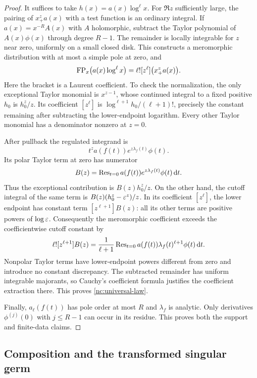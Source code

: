 \begin{proof}
It suffices to take $h(x)=a(x)\log^\ell x$. For $\Re z$ sufficiently
large, the pairing of $x_+^za(x)$ with a test function is an ordinary
integral. If $a(x)=x^{-R}A(x)$ with $A$ holomorphic, subtract the Taylor
polynomial of $A(x)\phi(x)$ through degree $R-1$. The remainder is
locally integrable for $z$ near zero, uniformly on a small closed disk.
This constructs a meromorphic distribution with at most a simple pole
at zero, and
\begin{equation}\label{nc:regulator-fp}
 \operatorname{FP}_x\bigl(a(x)\log^\ell x\bigr)
       =\ell![z^\ell]\bigl(x_+^za(x)\bigr).
\end{equation}
Here the bracket is a Laurent coefficient. To check the normalization,
the only exceptional Taylor monomial is $x^{z-1}$, whose continued
integral to a fixed positive $h_0$ is $h_0^z/z$. Its coefficient
$[z^\ell]$ is $\log^{\ell+1}h_0/(\ell+1)!$, precisely the constant
remaining after subtracting the lower-endpoint logarithm. Every other
Taylor monomial has a denominator nonzero at $z=0$.

After pullback the regulated integrand is
\[
 t^z a(f(t))e^{z\lambda_f(t)}\phi(t).
\]
Its polar Taylor term at zero has numerator
\begin{equation}\label{nc:Bregulator}
 B(z)=\operatorname{Res}_{t=0}a(f(t))e^{z\lambda_f(t)}\phi(t)\,\mathrm d t.
\end{equation}
Thus the exceptional contribution is $B(z)h_0^z/z$. On the other
hand, the cutoff integral of the same term is
$B(z)(h_0^z-\varepsilon^z)/z$. In its coefficient $[z^\ell]$, the lower
endpoint has constant term $[z^{\ell+1}]B(z)$: all its other terms
are positive powers of $\log\varepsilon$. Consequently the meromorphic
coefficient exceeds the coefficientwise cutoff constant by
\[
 \ell![z^{\ell+1}]B(z)
   =\frac1{\ell+1}\operatorname{Res}_{t=0}
      a(f(t))\lambda_f(t)^{\ell+1}\phi(t)\,\mathrm d t.
\]
Nonpolar Taylor terms have lower-endpoint powers different from zero
and introduce no constant discrepancy. The subtracted remainder has
uniform integrable majorants, so Cauchy's coefficient formula justifies
the coefficient extraction there. This proves
\eqref{nc:universal-law}.

Finally, $a_\ell(f(t))$ has pole order at most $R$ and $\lambda_f$ is
analytic. Only derivatives $\phi^{(j)}(0)$ with $j\leq R-1$ can occur
in its residue. This proves both the support and finite-data claims.
\end{proof}

\subsection{Composition and the transformed singular germ}

